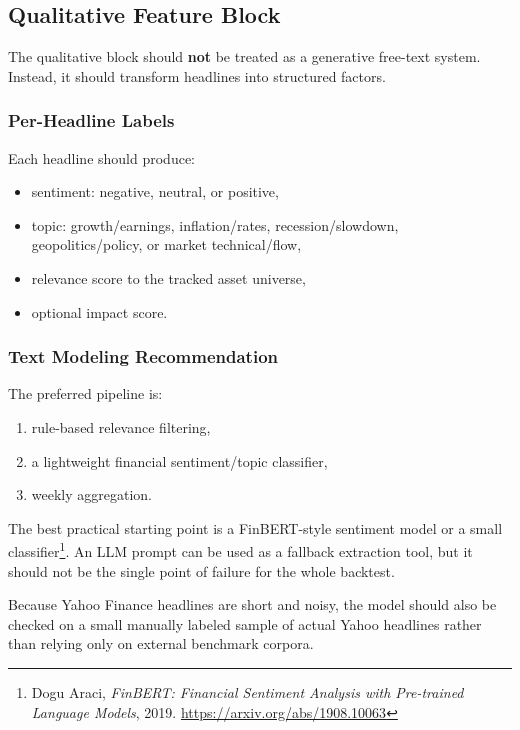 \documentclass[11pt,a4paper]{article}
\newcommand{\fncite}[2]{\footnote{#1. \url{#2}}}
\begin{document}
\subsection{Qualitative Feature Block}

The qualitative block should \textbf{not} be treated as a generative free-text system.
Instead, it should transform headlines into structured factors.

\subsubsection{Per-Headline Labels}

Each headline should produce:

\begin{itemize}[leftmargin=1.4em]
  \item sentiment: negative, neutral, or positive,
  \item topic: growth/earnings, inflation/rates, recession/slowdown, geopolitics/policy, or market technical/flow,
  \item relevance score to the tracked asset universe,
  \item optional impact score.
\end{itemize}

\subsubsection{Text Modeling Recommendation}

The preferred pipeline is:

\begin{enumerate}[leftmargin=1.5em]
  \item rule-based relevance filtering,
  \item a lightweight financial sentiment/topic classifier,
  \item weekly aggregation.
\end{enumerate}

The best practical starting point is a FinBERT-style sentiment model or a small classifier\fncite{Dogu Araci, \emph{FinBERT: Financial Sentiment Analysis with Pre-trained Language Models}, 2019}{https://arxiv.org/abs/1908.10063}.
An LLM prompt can be used as a fallback extraction tool, but it should not be the single point of failure for the whole backtest.

Because Yahoo Finance headlines are short and noisy, the model should also be checked on a small manually labeled sample of actual Yahoo headlines rather than relying only on external benchmark corpora.
\end{document}
